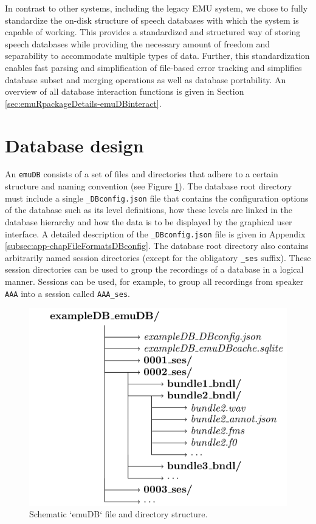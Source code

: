 \documentclass[]{book}
\begin{document}
In contrast to other systems, including the legacy EMU system, we chose to fully standardize the on-disk structure of speech databases with which the system is capable of working. This provides a standardized and structured way of storing speech databases while providing the necessary amount of freedom and separability to accommodate multiple types of data. Further, this standardization enables fast parsing and simplification of file-based error tracking and simplifies database subset and merging operations as well as database portability. An overview of all database interaction functions is given in Section \ref{sec:emuRpackageDetails-emuDBinteract}.

\hypertarget{database-design}{%
\section{Database design}\label{database-design}}

An \texttt{emuDB} consists of a set of files and directories that adhere to a certain structure and naming convention (see Figure \ref{fig:schematic-emuDB-structure}). The database root directory must include a single \texttt{\_DBconfig.json} file that contains the configuration options of the database such as its level definitions, how these levels are linked in the database hierarchy and how the data is to be displayed by the graphical user interface. A detailed description of the \texttt{\_DBconfig.json} file is given in Appendix \ref{subsec:app-chapFileFormatsDBconfig}. The database root directory also contains arbitrarily named session directories (except for the obligatory \texttt{\_ses} suffix). These session directories can be used to group the recordings of a database in a logical manner. Sessions can be used, for example, to group all recordings from speaker \texttt{AAA} into a session called \texttt{AAA\_ses}.

\begin{figure}

{\centering \includegraphics[width=0.65\linewidth]{pics/db_structure} 

}

\caption{Schematic `emuDB` file and directory structure.}\label{fig:schematic-emuDB-structure}
\end{figure}
\end{document}
